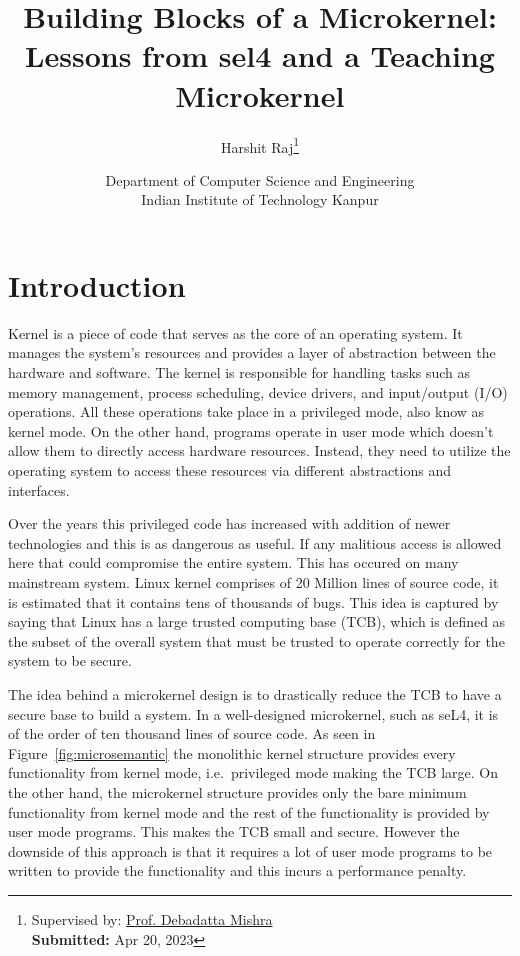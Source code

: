\documentclass[
	a4paper, %
	10pt, %
	unnumberedsections, %
	twoside, %
]{LTJournalArticle}
\title{Building Blocks of a Microkernel: \\ Lessons from sel4 and a Teaching Microkernel} %
\author{%
	Harshit Raj\thanks{Supervised by: \href{https://www.cse.iitk.ac.in/users/deba/}{Prof. Debadatta Mishra}\\ \textbf{Submitted:} Apr 20, 2023}
}
\date{\footnotesize Department of Computer Science and Engineering \\ Indian Institute of Technology Kanpur}
\begin{document}
\maketitle %


\section{Introduction}

Kernel is a piece of code that serves as the core of an operating system. It manages the system's resources and provides a layer of abstraction between the hardware and software. The kernel is responsible for handling tasks such as memory management, process scheduling, device drivers, and input/output (I/O) operations. All these operations take place in a privileged mode, also know as kernel mode. On the other hand, programs operate in user mode which doesn't allow them to directly access hardware resources. Instead, they need to utilize the operating system to access these resources via different abstractions and interfaces.

Over the years this privileged code has increased with addition of newer technologies and this is as dangerous as useful. If any malitious access is allowed here that could compromise the entire system. This has occured on many mainstream system. Linux kernel comprises of 20 Million lines of source code, it is estimated that it contains tens of thousands of bugs.\cite{Biggs:2018} This idea is captured by saying that Linux has a large trusted computing base (TCB), which is defined as the subset of the overall system that must be trusted to operate correctly for the system to be secure.\cite{Heiser:2020}

The idea behind a microkernel design is to drastically reduce the TCB to have a secure base to build a system. In a well-designed microkernel, such as seL4, it is of the order of ten thousand lines of source code. As seen in Figure~\ref{fig:microsemantic} the monolithic kernel structure provides every functionality from kernel mode, i.e.\ privileged mode making the TCB large. On the other hand, the microkernel structure provides only the bare minimum functionality from kernel mode and the rest of the functionality is provided by user mode programs. This makes the TCB small and secure. However the downside of this approach is that it requires a lot of user mode programs to be written to provide the functionality and this incurs a performance penalty.
\end{document}
